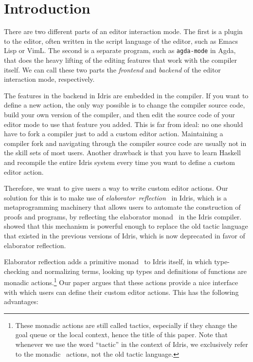 \section{Introduction} \label{chap:introduction}


There are two different parts of an editor interaction mode. The first is a
plugin to the editor, often written in the script language of the editor, such
as Emacs Lisp or VimL. The second is a separate program, such as
\texttt{agda-mode} in Agda, that does the heavy lifting of the editing features
that work with the compiler itself. We can call these two parts the
\emph{frontend} and \emph{backend} of the editor interaction mode,
respectively.

The features in the backend in Idris are embedded
in the compiler. If you want to define a new action, the only way possible is
to change the compiler source code, build your own version of the compiler,
and then edit the source code of your editor mode to use that feature you
added. This is far from ideal: no one should have to fork a compiler
just to add a custom editor action. Maintaining a compiler fork and
navigating through the compiler source code are usually not in the skill sets
of most users.
Another drawback is that you have to learn Haskell and recompile the
entire Idris system every time you want to define a custom editor action.

Therefore, we want to give users a way to write custom editor actions. Our
solution for this is to make use of \mbox{\emph{elaborator reflection}~\cite{elabref}} in
Idris, which is a metaprogramming machinery that allows users to automate the
construction of proofs and programs, by reflecting the elaborator
monad~\cite{idris} in the Idris compiler. \citet{elabref} showed that
this mechanism is powerful enough to replace the old tactic
language that existed in the previous versions of Idris, which is
now deprecated in favor of elaborator reflection.

Elaborator reflection adds a primitive monad \Elab\ to Idris itself, in which
type-checking and normalizing terms, looking up types and definitions of
functions are monadic actions.\footnote{These monadic actions are still called
tactics, especially if they change the goal queue or the local context, hence the
title of this paper. Note that whenever we use the word ``tactic'' in the
context of Idris, we exclusively refer to the monadic \Elab\ actions, not the
old tactic language.}
Our paper argues that these actions provide a nice interface with which users
can define their custom editor actions. This has the following advantages:

